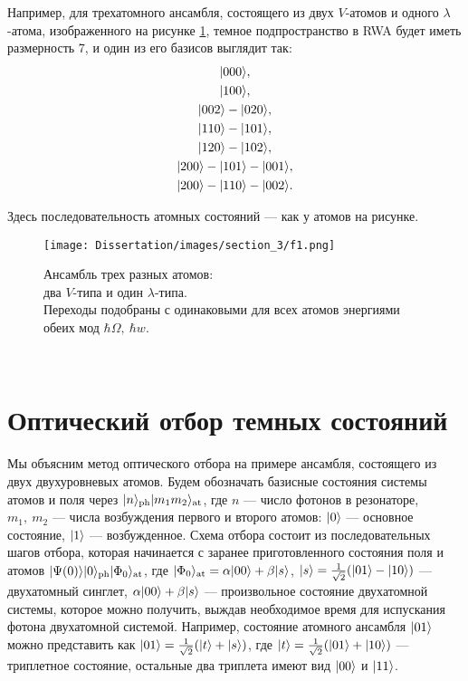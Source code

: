 Например, для трехатомного ансамбля, состоящего из двух $V$-атомов и одного $\lambda$-атома, изображенного на рисунке \ref{fig:three}, темное подпространство в RWA \cite{rwa_rabi_1,rwa_rabi_2,ozhigov_qq} будет иметь размерность 7, и один из его базисов выглядит так:
\begin{gather}
	|000\rangle,\notag\\
	|100\rangle,\notag\\
	|002\rangle - |020\rangle,\notag\\
	|110\rangle - |101\rangle,\notag\\ 
	|120\rangle - |102\rangle,\notag\\
	|200\rangle - |101\rangle - |001\rangle,\notag\\
	|200\rangle - |110\rangle - |002\rangle.\notag
\end{gather}

\noindent Здесь последовательность атомных состояний --- как у атомов на рисунке. 

\clearpage
\begin{figure}
	\noindent\centering\texttt{[image: Dissertation/images/section\_3/f1.png]}
	\captionsetup{format=hang,width=0.8\textwidth,justification=centering,singlelinecheck=no}
	\\[6pt]
	\caption{Ансамбль трех разных атомов:\\два $V$-типа и один $\lambda$-типа.\\ Переходы подобраны с одинаковыми для всех атомов энергиями обеих мод $\hbar\Omega,\ \hbar w$.}
	\label{fig:three}
\end{figure}
\
\section{Оптический отбор темных состояний}\label{sec:ch3/sect3}
Мы объясним метод оптического отбора на примере ансамбля, состоящего из двух двухуровневых атомов. Будем обозначать базисные состояния системы атомов и поля через $|n\rangle_{\text{ph}}|m_1m_2\rangle_{\text{at}}$, где $n$ --- число фотонов в резонаторе, $m_1,~m_2$ --- числа возбуждения первого и второго атомов: $|0\rangle$ --- основное состояние, $|1\rangle$ --- возбужденное. Схема отбора состоит из последовательных шагов отбора, которая начинается с заранее приготовленного состояния поля и атомов $|\Psi(0)\rangle|0\rangle_{\text{ph}}|\Phi_0\rangle_{\text{at}}$, где $|\Phi_{0}\rangle_{\text{at}}=\alpha |00\rangle+\beta |s\rangle$, $|s\rangle=\frac{1}{\sqrt{2}}(|01\rangle - |10\rangle)$ --- двухатомный синглет, $\alpha |00\rangle+\beta |s\rangle$ --- произвольное состояние двухатомной системы, которое можно получить, выждав необходимое время для испускания фотона двухатомной системой. Например, состояние атомного ансамбля $|01\rangle$ можно представить как $|01\rangle=\frac{1}{\sqrt 2}(|t\rangle+|s\rangle)$, где $|t\rangle=\frac{1}{\sqrt{2}}(|01\rangle+|10\rangle)$ --- триплетное состояние, остальные два триплета имеют вид $|00\rangle$ и $|11\rangle$. 

